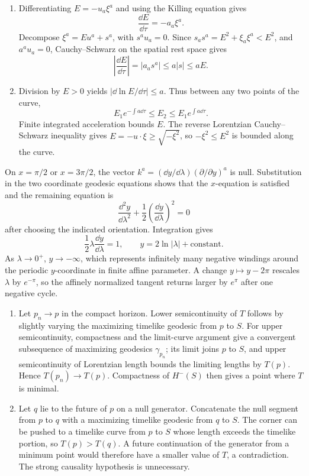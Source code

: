 \ExerciseEditorialNote

\begin{enumerate}[leftmargin=2.8em,itemsep=1.2em]
\begin{enumerate}[label=\alph*),leftmargin=2em]
\item Differentiating \(E=-u_a\xi^a\) and using the Killing equation gives
\[
 \frac{\dd E}{\dd\tau}=-a_a\xi^a.
\]
Decompose \(\xi^a=Eu^a+s^a\), with \(s^au_a=0\).  Since
\(s_as^a=E^2+\xi_a\xi^a<E^2\), and \(a^au_a=0\), Cauchy--Schwarz on the
spatial rest space gives
\[
 \left|\frac{\dd E}{\dd\tau}\right|=|a_as^a|
 \le a|s|\le aE.
\]

\item Division by \(E>0\) yields
\( |\dd\ln E/\dd\tau|\le a\).  Thus between any two points of the curve,
\[
 E_1e^{-\int a\dd\tau}\le E_2
 \le E_1e^{\int a\dd\tau}.
\]
Finite integrated acceleration bounds \(E\).  The reverse Lorentzian
Cauchy--Schwarz inequality gives
\(E=-u\mathbin\cdot\xi\ge\sqrt{-\xi^2}\), so
\(-\xi^2\le E^2\) is bounded along the curve.
\end{enumerate}

On \(x=\pi/2\) or \(x=3\pi/2\), the vector \(k^a=(\dd y/\dd\lambda)
(\partial/\partial y)^a\) is null.  Substitution in the two coordinate
geodesic equations shows that the \(x\)-equation is satisfied and the
remaining equation is
\[
 \frac{\dd^2y}{\dd\lambda^2}
 +\frac12\left(\frac{\dd y}{\dd\lambda}\right)^2=0
\]
after choosing the indicated orientation.  Integration gives
\[
 \frac12\lambda\frac{\dd y}{\dd\lambda}=1,
 \qquad y=2\ln|\lambda|+\text{constant}.
\]
As \(\lambda\to0^+\), \(y\to-\infty\), which represents infinitely many
negative windings around the periodic \(y\)-coordinate in finite affine
parameter.  A change \(y\mapsto y-2\pi\) rescales \(\lambda\) by
\(e^{-\pi}\), so the affinely normalized tangent returns larger by
\(e^\pi\) after one negative cycle.

\begin{enumerate}[label=(\roman*),leftmargin=2em]
\item Let \(p_n\to p\) in the compact horizon.  Lower semicontinuity of
\(T\) follows by slightly varying the maximizing timelike geodesic from
\(p\) to \(S\).  For upper semicontinuity, compactness and the limit-curve
argument give a convergent subsequence of maximizing geodesics
\(\gamma_{p_n}\); its limit joins \(p\) to \(S\), and upper semicontinuity
of Lorentzian length bounds the limiting lengths by \(T(p)\).  Hence
\(T(p_n)\to T(p)\).  Compactness of \(H^-(S)\) then gives a point where
\(T\) is minimal.

\item Let \(q\) lie to the future of \(p\) on a null generator.  Concatenate
the null segment from \(p\) to \(q\) with a maximizing timelike geodesic
from \(q\) to \(S\).  The corner can be pushed to a timelike curve from
\(p\) to \(S\) whose length exceeds the timelike portion, so
\(T(p)>T(q)\).  A future continuation of the generator from a minimum point
would therefore have a smaller value of \(T\), a contradiction.  The strong
causality hypothesis is unnecessary.
\end{enumerate}
\end{enumerate}
